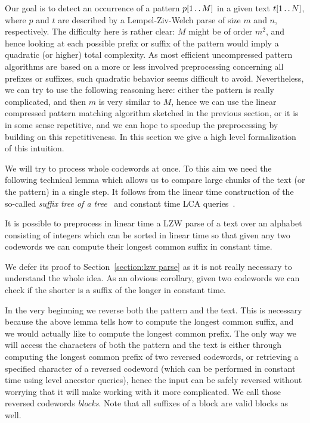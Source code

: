 \documentclass[runningheads]{llncs}
\newcommand{\twodots}{\mathinner{\ldotp\ldotp}}
\begin{document}
Our goal is to detect an occurrence of a pattern $p[1\twodots M]$ in a given text $t[1\twodots N]$, where $p$ and $t$ are described by a Lempel-Ziv-Welch parse of size $m$ and $n$, respectively. The difficulty here is rather clear: $M$ might be of order $m^{2}$, and hence looking at each possible prefix or suffix of the pattern would imply a quadratic (or higher) total complexity. As most efficient uncompressed pattern algorithms are
based on a more or less involved preprocessing concerning all prefixes or suffixes, such quadratic behavior seems difficult to avoid. Nevertheless,
we can try to use the following reasoning here: either the pattern is really complicated, and then $m$ is very similar to $M$, hence we can use the linear compressed pattern matching algorithm sketched in the previous section, or it is in some sense repetitive, and we can hope to speedup the preprocessing by building on this repetitiveness. In this section we give a high level formalization of this intuition. 

We will try to process whole codewords at once. To this aim we need the following technical lemma which allows us to compare large chunks of the text (or the pattern) in a single step. It follows from the linear time construction of the so-called {\it suffix tree of a tree}~\cite{ShibuyaTree} and constant time LCA queries~\cite{BenderLCA}.

\begin{lemma}
\label{lemma:parse preprocessing}
It is possible to preprocess in linear time a LZW parse of a text over an alphabet consisting of integers which can be sorted in linear time so that given any two codewords we can compute their longest common suffix in constant time.
\end{lemma}

We defer its proof to Section~\ref{section:lzw parse} as it is not really necessary to understand the whole idea. As an obvious corollary, given two codewords we can check if the shorter is a suffix of the longer in constant time.

In the very beginning we reverse both the pattern and the text. This is necessary because the above lemma tells how to compute the longest common suffix, and we would actually like to compute the longest common prefix. The only way we will access the characters of both the pattern and the text
is either through computing the longest common prefix of two reversed codewords, or retrieving a specified character of a reversed codeword (which can be performed in constant time using level ancestor queries), hence the input can be safely reversed without worrying that it will make working with it more complicated. We call those reversed codewords \emph{blocks}. Note that all suffixes of a block are valid blocks as well.
\end{document}

